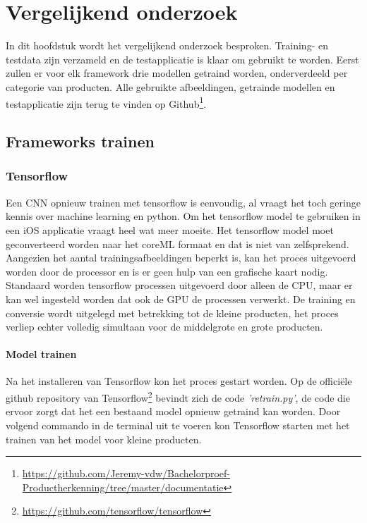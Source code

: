 \chapter{Vergelijkend onderzoek}
\label{ch:vergelijkend onderzoek}

In dit hoofdstuk wordt het vergelijkend onderzoek besproken. Training- en testdata zijn verzameld en de testapplicatie is klaar om gebruikt te worden. Eerst zullen er voor elk framework drie modellen getraind worden, onderverdeeld per categorie van producten. 
Alle gebruikte afbeeldingen, getrainde modellen en testapplicatie zijn terug te vinden op Github\footnote{\url{https://github.com/Jeremy-vdw/Bachelorproef-Productherkenning/tree/master/documentatie}}.

\section{Frameworks trainen}
\label{sec:Tensorflow}

\subsection{Tensorflow}
\label{ssec:Tensorflow}

Een \acrshort{CNN} opnieuw trainen met tensorflow is eenvoudig, al vraagt het toch geringe kennis over machine learning en python. Om het tensorflow model te gebruiken in een iOS applicatie vraagt heel wat meer moeite. Het tensorflow model moet geconverteerd worden naar het coreML formaat en dat is niet van zelfsprekend. Aangezien het aantal trainingsafbeeldingen beperkt is, kan het proces uitgevoerd worden door de processor en is er geen hulp van een grafische kaart nodig. Standaard worden tensorflow processen uitgevoerd door alleen de \acrshort{CPU}, maar er kan wel ingesteld worden dat ook de \acrshort{GPU} de processen verwerkt.  De training en conversie wordt uitgelegd met betrekking tot de kleine producten, het proces verliep echter volledig simultaan voor de middelgrote en grote producten.  

\subsubsection{Model trainen}
\label{sssec:Model trainen}

Na het installeren van Tensorflow kon het proces gestart worden. Op de officiële github repository van Tensorflow\footnote{\url{https://github.com/tensorflow/tensorflow}} bevindt zich de code \textit{'retrain.py'}, de code die ervoor zorgt dat het een bestaand model opnieuw getraind kan worden. Door volgend commando in de terminal uit te voeren kon Tensorflow starten met het trainen van het model voor kleine producten.

